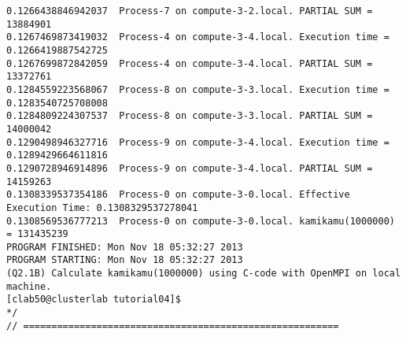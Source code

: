 \begin{lstlisting}[caption={App4-C++-MPI Execution Parallel Multiprocessing}, label=App4-C++-MPI Execution Parallel Multiprocessing]
0.1266438846942037 	Process-7 on compute-3-2.local. PARTIAL SUM = 13884901 
0.1267469873419032 	Process-4 on compute-3-4.local. Execution time = 0.1266419887542725 
0.1267699872842059 	Process-4 on compute-3-4.local. PARTIAL SUM = 13372761 
0.1284559223568067 	Process-8 on compute-3-3.local. Execution time = 0.1283540725708008 
0.1284809224307537 	Process-8 on compute-3-3.local. PARTIAL SUM = 14000042 
0.1290498946327716 	Process-9 on compute-3-4.local. Execution time = 0.1289429664611816 
0.1290728946914896 	Process-9 on compute-3-4.local. PARTIAL SUM = 14159263 
0.1308339537354186 	Process-0 on compute-3-0.local. Effective Execution Time: 0.1308329537278041 
0.1308569536777213 	Process-0 on compute-3-0.local. kamikamu(1000000) = 131435239 
PROGRAM FINISHED: Mon Nov 18 05:32:27 2013
PROGRAM STARTING: Mon Nov 18 05:32:27 2013
(Q2.1B) Calculate kamikamu(1000000) using C-code with OpenMPI on local machine.
[clab50@clusterlab tutorial04]$ 
*/
// ========================================================
\end{lstlisting}

